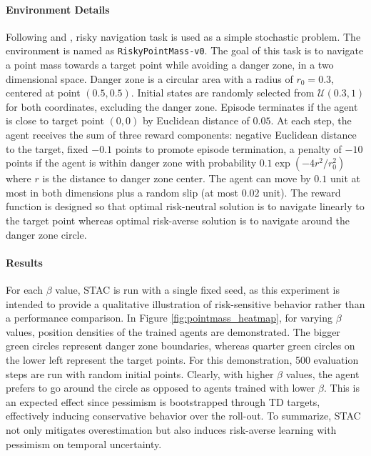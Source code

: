 \documentclass{article}
\begin{document}
\paragraph{Environment Details} Following \citet{ma2021conservative} and \citet{ma2025dsac}, risky navigation task is used as a simple stochastic problem. The environment is named as \verb~RiskyPointMass-v0~. The goal of this task is to navigate a point mass towards a target point while avoiding a danger zone, in a two dimensional space. Danger zone is a circular area with a radius of $r_0 = 0.3$, centered at point $(0.5, 0.5)$. Initial states are randomly selected from $\mathcal{U}(0.3, 1)$ for both coordinates, excluding the danger zone. Episode terminates if the agent is close to target point $(0, 0)$ by Euclidean distance of $0.05$. At each step, the agent receives the sum of three reward components: negative Euclidean distance to the target, fixed $-0.1$ points to promote episode termination, a penalty of $-10$ points if the agent is within danger zone with probability $0.1\exp(-4 r^2/r_0^2)$ where $r$ is the distance to danger zone center. The agent can move by $0.1$ unit at most in both dimensions plus a random slip (at most $0.02$ unit). The reward function is designed so that optimal risk-neutral solution is to navigate linearly to the target point whereas optimal risk-averse solution is to navigate around the danger zone circle. 

\paragraph{Results} For each $\beta$ value, STAC is run with a single fixed seed, as this experiment is intended to provide a qualitative illustration of risk-sensitive behavior rather than a performance comparison. In Figure \ref{fig:pointmass_heatmap}, for varying $\beta$ values, position densities of the trained agents are demonstrated. The bigger green circles represent danger zone boundaries, whereas quarter green circles on the lower left represent the target points. For this demonstration, 500 evaluation steps are run with random initial points. Clearly, with higher $\beta$ values, the agent prefers to go around the circle as opposed to agents trained with lower $\beta$. This is an expected effect since pessimism is bootstrapped through TD targets, effectively inducing conservative behavior over the roll-out. To summarize, STAC not only mitigates overestimation but also induces risk-averse learning with pessimism on temporal uncertainty. 
\end{document}
